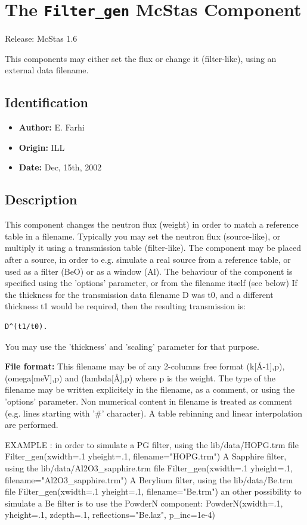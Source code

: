 \section{The \texttt{Filter\_gen} McStas Component}
Release: McStas 1.6

This components may either set the flux or change it (filter-like), using
an external data filename.

\subsection*{Identification}
\begin{itemize}
  \item \textbf{Author:} E. Farhi
  \item \textbf{Origin:} ILL
  \item \textbf{Date:} Dec, 15th, 2002
\end{itemize}

\subsection*{Description}
This component changes the neutron flux (weight) in order to match a reference table in a filename. Typically you may set the neutron flux (source-like), or multiply it using a transmission table (filter-like). The component may be placed after a source, in order to e.g. simulate a real source from a reference table, or used as a filter (BeO) or as a window (Al). The behaviour of the component is specified using the 'options' parameter, or from the filename itself (see below) If the thickness for the transmission data filename D was t0, and a different thickness t1 would be required, then the resulting transmission is:

\begin{verbatim}
D^(t1/t0).
\end{verbatim}

You may use the 'thickness' and 'scaling' parameter for that purpose.

\textbf{File format:} This filename may be of any 2-columns free format (k[\AA{}-1],p), (omega[meV],p) and (lambda[\AA{}],p) where p is the weight. The type of the filename may be written explicitely in the filename, as a comment, or using the 'options' parameter. Non mumerical content in filename is treated as comment (e.g. lines starting with '\#' character). A table rebinning and linear interpolation are performed.

EXAMPLE : in order to simulate a PG filter, using the lib/data/HOPG.trm file Filter\_gen(xwidth=.1 yheight=.1, filename="HOPG.trm") A Sapphire filter, using the lib/data/Al2O3\_sapphire.trm file Filter\_gen(xwidth=.1 yheight=.1, filename="Al2O3\_sapphire.trm") A Berylium filter, using the lib/data/Be.trm file Filter\_gen(xwidth=.1 yheight=.1, filename="Be.trm") an other possibility to simulate a Be filter is to use the PowderN component: PowderN(xwidth=.1, yheight=.1, zdepth=.1, reflections="Be.laz", p\_inc=1e-4)

